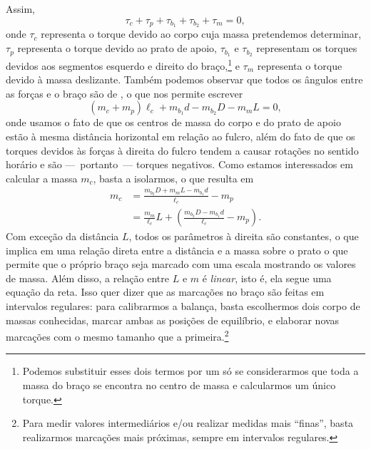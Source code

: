 Assim,
\begin{equation}
    \tau_c + \tau_p + \tau_{b_1} + \tau_{b_2} + \tau_m = 0,
\end{equation}
%
onde $\tau_c$ representa o torque devido ao corpo cuja massa pretendemos determinar, $\tau_p$ representa o torque devido ao prato de apoio, $\tau_{b_1}$ e $\tau_{b_2}$ representam os torques devidos aos segmentos esquerdo e direito do braço,\footnote{Podemos substituir esses dois termos por um só se considerarmos que toda a massa do braço se encontra no centro de massa e calcularmos um único torque.} e $\tau_m$ representa o torque devido à massa deslizante. Também podemos observar que todos os ângulos entre as forças e o braço são de , o que nos permite escrever
\begin{equation}
    (m_c + m_p) \ell_c + m_{b_1} d - m_{b_2} D - m_m L = 0,
\end{equation}
%
onde usamos o fato de que os centros de massa do corpo e do prato de apoio estão à mesma distância horizontal em relação ao fulcro, além do fato de que os torques devidos às forças à direita do fulcro tendem a causar rotações no sentido horário e são ---~portanto~--- torques negativos. Como estamos interessados em calcular a massa $m_c$, basta a isolarmos, o que resulta em
\begin{align}
    m_c &= \frac{m_{b_2} D + m_m L - m_{b_1}d}{\ell_c} - m_p\\
    &= \frac{m_{m}}{\ell_c} L + \left(\frac{m_{b_2} D - m_{b_1}d}{\ell_c} - m_p\right).
\end{align}
%
Com exceção da distância $L$, todos os parâmetros à direita são constantes, o que implica em uma relação direta entre a distância e a massa sobre o prato o que permite que o próprio braço seja marcado com uma escala mostrando os valores de massa. Além disso, a relação entre $L$ e $m$ é \emph{linear}, isto é, ela segue uma equação da reta. Isso quer dizer que as marcações no braço são feitas em intervalos regulares: para calibrarmos a balança, basta escolhermos dois corpo de massas conhecidas, marcar ambas as posições de equilíbrio, e elaborar novas marcações com o mesmo tamanho que a primeira.\footnote[][-2cm]{Para medir valores intermediários e/ou realizar medidas mais ``finas'', basta realizarmos marcações mais próximas, sempre em intervalos regulares.}


